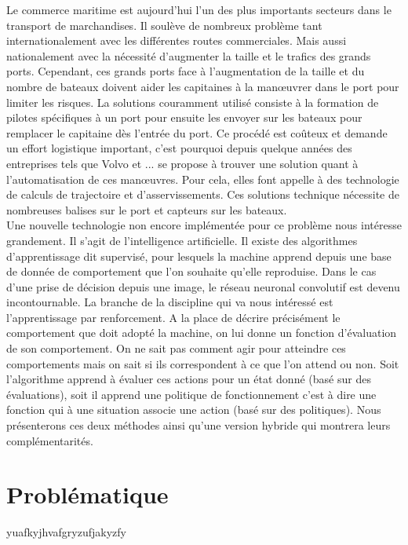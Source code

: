 \documentclass[12pt,a4paper]{extarticle}
\begin{document}
\indent Le commerce maritime est aujourd'hui l'un des plus importants secteurs dans le transport de marchandises. Il soulève de nombreux problème tant internationalement avec les différentes routes commerciales. Mais aussi nationalement avec la nécessité d'augmenter la taille et le trafics des grands ports. Cependant, ces grands ports face à l'augmentation de la taille et du nombre de bateaux doivent aider les capitaines à la manœuvrer dans le port pour limiter les risques. La solutions couramment utilisé consiste à la formation de pilotes spécifiques à un port pour ensuite les envoyer sur les bateaux pour remplacer le capitaine dès l'entrée du port. Ce procédé est coûteux et demande un effort logistique important, c'est pourquoi depuis quelque années des entreprises tels que Volvo et ... se propose à trouver une solution quant à l'automatisation de ces manœuvres. Pour cela, elles font appelle à des technologie de calculs de trajectoire et d'asservissements. Ces solutions technique nécessite de nombreuses balises sur le port et capteurs sur les bateaux.
\\
\indent Une nouvelle technologie non encore implémentée pour ce problème nous intéresse grandement. Il s'agit de l'intelligence artificielle. Il existe des algorithmes d'apprentissage dit supervisé, pour lesquels la machine apprend depuis une base de donnée de comportement que l'on souhaite qu'elle reproduise. Dans le cas d'une prise de décision depuis une image, le réseau neuronal convolutif est devenu incontournable. La branche de la discipline qui va nous intéressé est l'apprentissage par renforcement. A la place de décrire précisément le comportement que doit adopté la machine, on lui donne un fonction d'évaluation de son comportement. On ne sait pas comment agir pour atteindre ces comportements mais on sait si ils correspondent à ce que l'on attend ou non. Soit l'algorithme apprend à évaluer ces actions pour un état donné (basé sur des évaluations), soit il apprend une politique de fonctionnement c'est à dire une fonction qui à une situation associe une action (basé sur des politiques). Nous présenterons ces deux méthodes ainsi qu'une version hybride qui montrera leurs complémentarités.

 
 
\section*{Problématique}

\indent yuafkyjhvafgryzufjakyzfy
\end{document}
